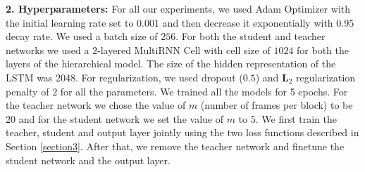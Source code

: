 \documentclass[10pt,twocolumn,letterpaper]{article}
\begin{document}
\noindent \textbf{2. Hyperparameters:}
For all our experiments, we used Adam Optimizer with the initial learning rate set to $0.001$  and then decrease it exponentially with $0.95$ decay rate. We used a batch size of $256$. For both the student and teacher networks we used a $2$-layered MultiRNN Cell with cell size of $1024$ for both the layers of the hierarchical model. The size of the hidden representation of the LSTM was 2048. %
For regularization, we used dropout ($0.5$) and $\mathbf{L}_{2}$ regularization penalty of $2$ for all the parameters. We trained all the models for 5 epochs. For the teacher network we chose the value of $m$ (number of frames per block) to be 20 and for the student network we set the value of $m$ to 5. We first train the teacher, student and output layer jointly using the two loss functions described in Section \ref{section3}. After that, we remove the teacher network and finetune the student network and the output layer. \\
\end{document}
